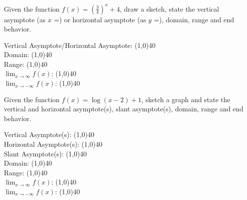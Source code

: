 \documentclass[addpoints]{exam}
\begin{document}
\begin{questions}
    \newpage
    \question[1] Given the function $f(x) = (\frac{3}{4})^x + 4$, draw a sketch, state the vertical asymptote (as $x$ =) or horizontal asymptote (as $y$ =), domain, range and end behavior.
    
        \begin{left} 
        \end{left}
    
    Vertical Asymptote/Horizontal Asymptote: \line(1,0){40} \\
    \newline
    Domain: \line(1,0){40} \\
    \newline
    Range: \line(1,0){40} \\
    \newline
    $\lim_{x\to\infty} f(x)$: \line(1,0){40} \\
    \newline
    $\lim_{x\to-\infty} f(x)$: \line(1,0){40} \\
    
    \question[1] Given the function $f(x) = \log (x-2) + 1$, sketch a graph and state the vertical and horizontal asymptote(s), slant asymptote(s), domain, range and end behavior.
    
        \begin{left} 
        \end{left}
    
    Vertical Asymptote(s): \line(1,0){40} \\
    \newline
    Horizontal Asymptote(s): \line(1,0){40} \\
    \newline
    Slant Asymptote(s): \line(1,0){40} \\
    \newline
    Domain: \line(1,0){40} \\
    \newline
    Range: \line(1,0){40} \\
    \newline
    $\lim_{x\to\infty} f(x)$: \line(1,0){40} \\
    \newline
    $\lim_{x\to-\infty} f(x)$: \line(1,0){40} \\
    

\end{questions}
\end{document}
